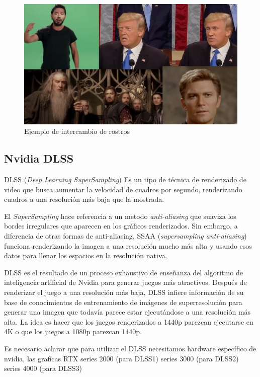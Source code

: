 \documentclass[runningheads]{llncs} %
\begin{document}
\begin{figure}
    \centering
    \includegraphics[scale=0.35]{ej4-deepfake.jpg}
    \caption{Ejemplo de intercambio de rostros \cite{ej-deepfake1}}
    \label{fig:deepfake-ej4}
\end{figure}

\newpage
\subsection{Nvidia DLSS}
DLSS (\textit{Deep Learning SuperSampling}) Es un tipo de técnica de 
renderizado de video que busca aumentar la velocidad de cuadros por
segundo, renderizando cuadros a una resolución más baja que la mostrada.

El \textit{SuperSampling} hace
referencia a un metodo \textit{anti-aliasing} que suaviza los bordes 
irregulares que aparecen en los gráficos renderizados. 
Sin embargo, a diferencia de otras formas de anti-aliasing, 
SSAA (\textit{supersampling anti-aliasing}) funciona renderizando la imagen 
a una resolución mucho más alta y usando esos datos para llenar 
los espacios en la resolución nativa. \cite{ej-dlss}

DLSS es el resultado de un proceso exhaustivo de enseñanza del algoritmo
de inteligencia artificial de Nvidia para generar juegos más atractivos.
Después de renderizar el juego a una resolución más baja, 
DLSS infiere información de su base de conocimientos de entrenamiento 
de imágenes de superresolución para generar una imagen que todavía 
parece estar ejecutándose a una resolución más alta. 
La idea es hacer que los juegos renderizados a 1440p parezcan 
ejecutarse en 4K o que los juegos a 1080p parezcan 1440p. \cite{ej-dlss}

Es necesario aclarar que para utilizar el DLSS necesitamos hardware específico
de nvidia, las graficas RTX series 2000 (para DLSS1) series 3000 (para DLSS2)
series 4000 (para DLSS3)
\end{document}
